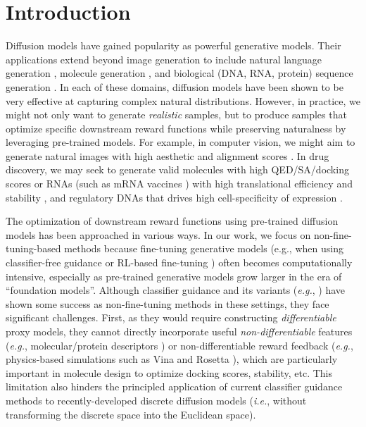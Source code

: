 \vspace{-2mm}
\section{Introduction}\label{sec:intro}
\vspace{-2mm}

Diffusion models have gained popularity as powerful generative models. Their applications extend beyond image generation to include natural language generation \citep{sahoo2024simple,shi2024simplified,lou2023discrete}, molecule generation \citep{jo2022score,vignac2022digress}, and biological (DNA, RNA, protein) sequence generation \citep{avdeyev2023dirichlet,stark2024dirichlet}. In each of these domains, diffusion models have been shown to be very effective at capturing complex natural distributions. However, in practice, we might not only want to generate \emph{realistic} samples, but to produce samples that optimize specific downstream reward functions while preserving naturalness by leveraging pre-trained models. For example, in computer vision, we might aim to generate natural images with high aesthetic and alignment scores \citep{black2023training,fan2023dpok}. In drug discovery, we may seek to generate valid molecules with high QED/SA/docking scores \citep{lee2023exploring,jin2018junction} or RNAs (such as mRNA vaccines \citep{cheng2023research}) with high translational efficiency and stability \citep{castillo2021machine,asrani2018optimization}, and regulatory DNAs that drives high cell-specificity of expression \citep{gosai2023machine,taskiran2024cell,lal2024reglm}.    

The optimization of downstream reward functions using pre-trained diffusion models has been approached in various ways. In our work, we focus on non-fine-tuning-based methods because fine-tuning generative models (e.g., when using classifier-free guidance \citep{ho2020denoising} or RL-based fine-tuning \citep{black2023training,fan2023dpok,uehara2024finetuning,clark2023directly,prabhudesai2023aligning}) often becomes computationally intensive, especially as pre-trained generative models grow larger in the era of ``foundation models''. Although classifier guidance and its variants (\textit{e.g.}, \citet{dhariwal2021diffusion,song2020score,chung2022diffusion,bansal2023universal,ho2022video}) have shown some success as non-fine-tuning methods in these settings, they face significant challenges. First, as they would require constructing \emph{differentiable} proxy models, they cannot directly incorporate useful \emph{non-differentiable} features (\textit{e.g.}, molecular/protein descriptors \citep{van2013benchmarking,ghiringhelli2015big,gainza2020deciphering}) or non-differentiable reward feedback (\textit{e.g.}, physics-based simulations such as Vina and Rosetta \citep{trott2010autodock,alhossary2015fast,alford2017rosetta}), which are particularly important in molecule design to optimize docking scores, stability, etc. This limitation also hinders the principled application of current classifier guidance methods to recently-developed discrete diffusion models \citep{austin2021structured,campbell2022continuous,lou2023discrete} (\textit{i.e.}, without transforming the discrete space into the Euclidean space). %


